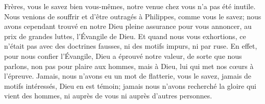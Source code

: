 Frères, vous le savez bien vous-mêmes, notre venue chez vous n’a pas été inutile.
Nous venions de souffrir et d’être outragés à Philippes, comme vous le savez;
	nous avons cependant trouvé en notre Dieu pleine assurance
	pour vous annoncer, au prix de grandes luttes, l’Évangile de Dieu.
Et quand nous vous exhortions,
	ce n’était pas avec des doctrines fausses, ni des motifs impurs, ni par ruse.
En effet, pour nous confier l’Évangile, Dieu a éprouvé notre valeur,
	de sorte que nous parlons, non pas pour plaire aux hommes, mais à Dieu,
	lui qui met nos cœurs à l’épreuve.
Jamais, nous n’avons eu un mot de flatterie, vous le savez,
	jamais de motifs intéressés, Dieu en est témoin;
	jamais nous n’avons recherché la gloire qui vient des hommes,
	ni auprès de vous ni auprès d’autres personnes.

